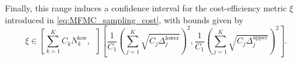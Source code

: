 Finally, this range induces a confidence interval for the cost-efficiency metric $\xi$ introduced in \eqref{eq:MFMC_sampling_cost}, with bounds given by
%
\begin{equation}\label{eq:MFMC_sampling_cost_efficiency_CI}
    \xi \in  \left[\sum_{k=1}^K C_k N_k^{\text{low}},\;\; \right]\left[\frac{1}{C_1} \left(\sum_{j=1}^K\sqrt{C_j\Delta_j^{\text{lower}}}\right)^2,\frac{1}{C_1} \left(\sum_{j=1}^K\sqrt{C_j\Delta_j^{\text{upper}}}\right)^2\right].
\end{equation}
%

